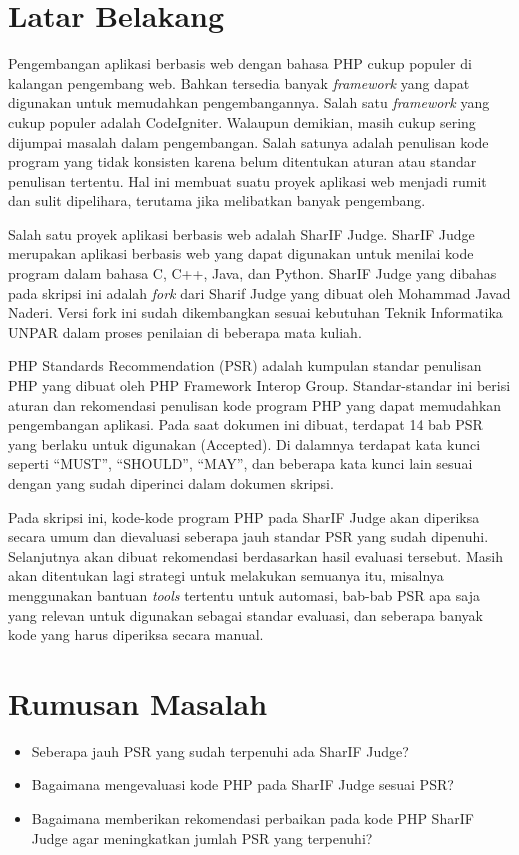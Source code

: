 \documentclass[a4paper,twoside]{article}
\begin{document}
\section{Latar Belakang}
Pengembangan aplikasi berbasis web dengan bahasa PHP cukup populer di kalangan pengembang web. Bahkan tersedia banyak \textit{framework} yang dapat digunakan untuk memudahkan pengembangannya. Salah satu \textit{framework} yang cukup populer adalah CodeIgniter. Walaupun demikian, masih cukup sering dijumpai masalah dalam pengembangan. Salah satunya adalah penulisan kode program yang tidak konsisten karena belum ditentukan aturan atau standar penulisan tertentu. Hal ini membuat suatu proyek aplikasi web menjadi rumit dan sulit dipelihara, terutama jika melibatkan banyak pengembang. 

Salah satu proyek aplikasi berbasis web adalah SharIF Judge. SharIF Judge merupakan aplikasi berbasis web yang dapat digunakan untuk menilai kode program dalam bahasa C, C++, Java, dan Python. SharIF Judge yang dibahas pada skripsi ini adalah \textit{fork} dari Sharif Judge yang dibuat oleh Mohammad Javad Naderi. Versi fork ini sudah dikembangkan sesuai kebutuhan Teknik Informatika UNPAR dalam proses penilaian di beberapa mata kuliah.

PHP Standards Recommendation (PSR) adalah kumpulan standar penulisan PHP yang dibuat oleh PHP Framework Interop Group. Standar-standar ini berisi aturan dan rekomendasi penulisan kode program PHP yang dapat memudahkan pengembangan aplikasi. Pada saat dokumen ini dibuat, terdapat 14 bab PSR yang berlaku untuk digunakan (Accepted). Di dalamnya terdapat kata kunci seperti ``MUST'', ``SHOULD'', ``MAY'', dan beberapa kata kunci lain sesuai dengan yang sudah diperinci dalam dokumen skripsi.

Pada skripsi ini, kode-kode program PHP pada SharIF Judge akan diperiksa secara umum dan dievaluasi seberapa jauh standar PSR yang sudah dipenuhi. Selanjutnya akan dibuat rekomendasi berdasarkan hasil evaluasi tersebut. Masih akan ditentukan lagi strategi untuk melakukan semuanya itu, misalnya menggunakan bantuan \textit{tools} tertentu untuk automasi, bab-bab PSR apa saja yang relevan untuk digunakan sebagai standar evaluasi, dan seberapa banyak kode yang harus diperiksa secara manual. 
\section{Rumusan Masalah}
\begin{itemize}
	\item Seberapa jauh PSR yang sudah terpenuhi ada SharIF Judge?
	\item Bagaimana mengevaluasi kode PHP pada SharIF Judge sesuai PSR?  
	\item Bagaimana memberikan rekomendasi perbaikan pada kode PHP SharIF Judge agar meningkatkan jumlah PSR yang terpenuhi?
\end{itemize}
\end{document}
